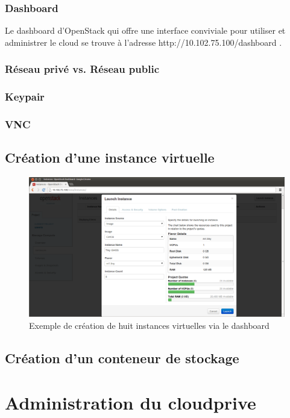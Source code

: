 \documentclass[a4paper,oneside]{report}
\begin{document}
\subsection{Dashboard}
Le dashboard d'OpenStack qui offre une interface conviviale pour utiliser et administrer le cloud se trouve à l'adresse http://10.102.75.100/dashboard .

\subsection{Réseau privé vs. Réseau public}

\subsection{Keypair}

\subsection{VNC}


\section{Création d'une instance virtuelle}
\begin{figure}[!h]
\centering
\includegraphics[resolution=200]{images/dashboard_create_details.png}
\caption{Exemple de création de huit instances virtuelles via le dashboard}
\end{figure}

\section{Création d'un conteneur de stockage}

\chapter{Administration du \gls{cloudprive}}
\end{document}
